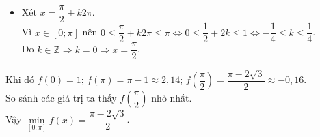 \begin{ex}
{\begin{itemchoice}
\begin{itemize}
				Do $k\in\mathbb{Z}$ nên không tồn tại giá trị $k$ thỏa mãn.
				\item Xét $x=\dfrac{\pi}{2}+k2\pi$.\\
				Vì $x \in [0;\pi]$ nên $0\le \dfrac{\pi}{2}+k2\pi\le \pi\Leftrightarrow 0\le \dfrac{1}{2}+2k\le 1\Leftrightarrow -\dfrac{1}{4}\le k\le \dfrac{1}{4}$.\\
				Do $k\in\mathbb{Z}\Rightarrow k=0\Rightarrow x=\dfrac{\pi}{2}$.
			\end{itemize}
			Khi đó $f(0)= 1$; $f(\pi) = \pi - 1 \approx 2{,}14$; $f\left(\dfrac{\pi}{2}\right) = \dfrac{\pi-2\sqrt{3}}{2} \approx -0{,}16$.\\
			So sánh các giá trị ta thấy $f\left(\dfrac{\pi}{2}\right)$ nhỏ nhất.\\
			Vậy $\min\limits_{[0;\pi]} f(x)=\dfrac{\pi-2\sqrt{3}}{2}$.
		\end{itemchoice}
	}
\end{ex}

